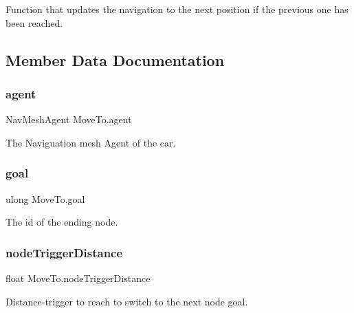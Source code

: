 Function that updates the navigation to the next position if the previous one has been reached. 

\subsection{Member Data Documentation}
\mbox{\label{classMoveTo_aff222c2a2538f0e0e496eaccb47b729c}} 
\subsubsection{\texorpdfstring{agent}{agent}}
{\footnotesize\ttfamily Nav\+Mesh\+Agent Move\+To.\+agent\hspace{0.3cm}{\ttfamily [private]}}



The Naviguation mesh Agent of the car.

\mbox{\label{classMoveTo_a82c0a0458f805d03723a2c4b22fcff04}} 
\subsubsection{\texorpdfstring{goal}{goal}}
{\footnotesize\ttfamily ulong Move\+To.\+goal}



The id of the ending node.

\mbox{\label{classMoveTo_ac75444070364c7dff21fb8be45488e40}} 
\subsubsection{\texorpdfstring{node\+Trigger\+Distance}{nodeTriggerDistance}}
{\footnotesize\ttfamily float Move\+To.\+node\+Trigger\+Distance\hspace{0.3cm}{\ttfamily [private]}}



Distance-\/trigger to reach to switch to the next node goal.

\mbox{\label{classMoveTo_ac005c40e3b3058e444d5099ee11dcb32}} 
